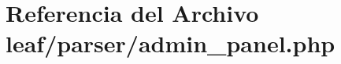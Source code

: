 \hypertarget{admin__panel_8php}{\section{Referencia del Archivo leaf/parser/admin\-\_\-panel.php}
\label{admin__panel_8php}
}
